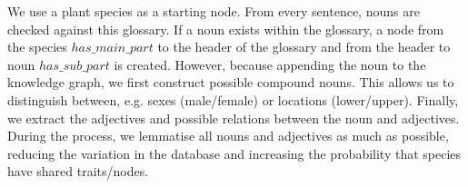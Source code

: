 \documentclass[a4paper, 12pt, oneside]{book} %
\begin{document}

We use a plant species as a starting node.
From every sentence, nouns are checked against this glossary.
If a noun exists within the glossary, a node from the species $has\_main\_part$ to the header of the glossary and from the header to noun $has\_sub\_part$ is created.
However, because appending the noun to the knowledge graph, we first construct possible compound nouns.
This allows us to distinguish between, e.g. sexes (male/female) or locations (lower/upper).
Finally, we extract the adjectives and possible relations between the noun and adjectives.
During the process, we lemmatise all nouns and adjectives as much as possible, reducing the variation in the database and increasing the probability that species have shared traits/nodes.
\end{document}
